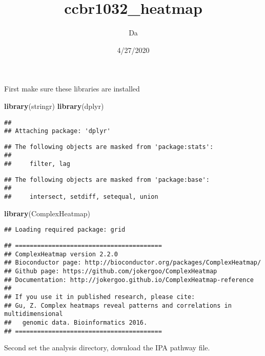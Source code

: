 \documentclass[]{article}
\title{ccbr1032\_heatmap}
\author{Da}
\date{4/27/2020}
\newenvironment{Shaded}{\begin{snugshade}}{\end{snugshade}}
\newcommand{\KeywordTok}[1]{\textcolor[rgb]{0.13,0.29,0.53}{\textbf{#1}}}
\newcommand{\NormalTok}[1]{#1}
\begin{document}
\maketitle

First make sure these libraries are installed

\begin{Shaded}
\begin{Highlighting}[]
\KeywordTok{library}\NormalTok{(stringr)}
\KeywordTok{library}\NormalTok{(dplyr)}
\end{Highlighting}
\end{Shaded}

\begin{verbatim}
## 
## Attaching package: 'dplyr'
\end{verbatim}

\begin{verbatim}
## The following objects are masked from 'package:stats':
## 
##     filter, lag
\end{verbatim}

\begin{verbatim}
## The following objects are masked from 'package:base':
## 
##     intersect, setdiff, setequal, union
\end{verbatim}

\begin{Shaded}
\begin{Highlighting}[]
\KeywordTok{library}\NormalTok{(ComplexHeatmap)}
\end{Highlighting}
\end{Shaded}

\begin{verbatim}
## Loading required package: grid
\end{verbatim}

\begin{verbatim}
## ========================================
## ComplexHeatmap version 2.2.0
## Bioconductor page: http://bioconductor.org/packages/ComplexHeatmap/
## Github page: https://github.com/jokergoo/ComplexHeatmap
## Documentation: http://jokergoo.github.io/ComplexHeatmap-reference
## 
## If you use it in published research, please cite:
## Gu, Z. Complex heatmaps reveal patterns and correlations in multidimensional 
##   genomic data. Bioinformatics 2016.
## ========================================
\end{verbatim}

Second set the analysis directory, download the IPA pathway file.
\end{document}

